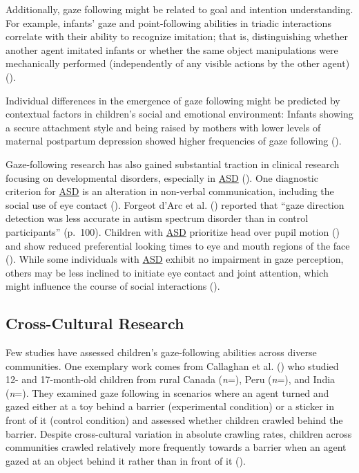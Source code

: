 \documentclass[
]{scrbook}
\begin{document}
Additionally, gaze following might be related to goal and intention understanding. For example, infants' gaze and point-following abilities in triadic interactions correlate with their ability to recognize imitation; that is, distinguishing whether another agent imitated infants or whether the same object manipulations were mechanically performed (independently of any visible actions by the other agent) ().

Individual differences in the emergence of gaze following might be predicted by contextual factors in children's social and emotional environment: Infants showing a secure attachment style and being raised by mothers with lower levels of maternal postpartum depression showed higher frequencies of gaze following ().

Gaze-following research has also gained substantial traction in clinical research focusing on developmental disorders, especially in \hyperref[acronyms_ASD]{ASD} (). One diagnostic criterion for \hyperref[acronyms_ASD]{ASD} is an alteration in non-verbal communication, including the social use of eye contact (). Forgeot d'Arc et al. () reported that ``gaze direction detection was less accurate in autism spectrum disorder than in control participants'' (p.~100). Children with \hyperref[acronyms_ASD]{ASD} prioritize head over pupil motion () and show reduced preferential looking times to eye and mouth regions of the face (). While some individuals with \hyperref[acronyms_ASD]{ASD} exhibit no impairment in gaze perception, others may be less inclined to initiate eye contact and joint attention, which might influence the course of social interactions ().

\subsection{Cross-Cultural Research}\label{intro-gaze-cc}

Few studies have assessed children's gaze-following abilities across diverse communities. One exemplary work comes from Callaghan et al. () who studied 12- and 17-month-old children from rural Canada (\emph{n}\thinspace =), Peru (\emph{n}\thinspace =), and India (\emph{n}\thinspace =). They examined gaze following in scenarios where an agent turned and gazed either at a toy behind a barrier (experimental condition) or a sticker in front of it (control condition) and assessed whether children crawled behind the barrier. Despite cross-cultural variation in absolute crawling rates, children across communities crawled relatively more frequently towards a barrier when an agent gazed at an object behind it rather than in front of it ().
\end{document}
